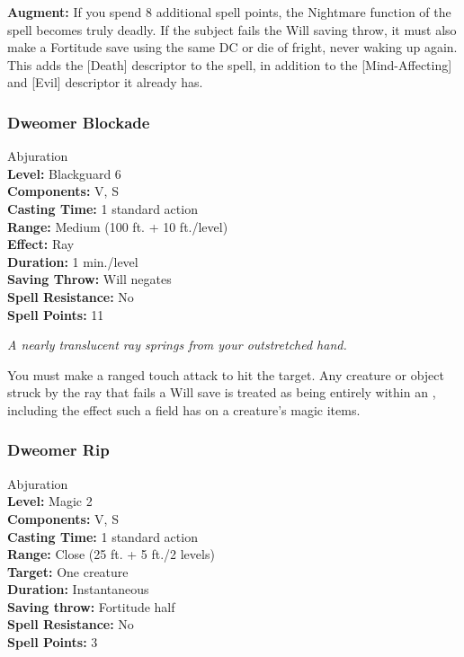 \textbf{Augment:} If you spend 8 additional spell points, the Nightmare function of the spell becomes truly deadly.
If the subject fails the Will saving throw, it must also make a Fortitude save using the same DC or die of fright, never waking up again.
This adds the [Death] descriptor to the spell, in addition to the [Mind-Affecting] and [Evil] descriptor it already has.
\subsubsection{Dweomer Blockade}
\label{Spell:DweomerBlockade}
Abjuration
\\ \textbf{Level:} Blackguard 6
\\ \textbf{Components:} V, S
\\ \textbf{Casting Time:} 1 standard action
\\ \textbf{Range:} Medium (100 ft. + 10 ft./level)
\\ \textbf{Effect:} Ray
\\ \textbf{Duration:} 1 min./level
\\ \textbf{Saving Throw:} Will negates
\\ \textbf{Spell Resistance:} No
\\ \textbf{Spell Points:} 11

\emph{A nearly translucent ray springs from your outstretched hand.} 

You must make a ranged touch attack to hit the target. 
Any creature or object struck by the ray that fails a Will save is treated as being entirely within an , including the effect such a field has on a creature's magic items.
\subsubsection{Dweomer Rip}
\label{Spell:DweomerRip}
Abjuration
\\ \textbf{Level:} Magic 2
\\ \textbf{Components:} V, S
\\ \textbf{Casting Time:} 1 standard action
\\ \textbf{Range:} Close (25 ft. + 5 ft./2 levels)
\\ \textbf{Target:} One creature
\\ \textbf{Duration:} Instantaneous
\\ \textbf{Saving throw:} Fortitude half
\\ \textbf{Spell Resistance:} No
\\ \textbf{Spell Points:} 3

